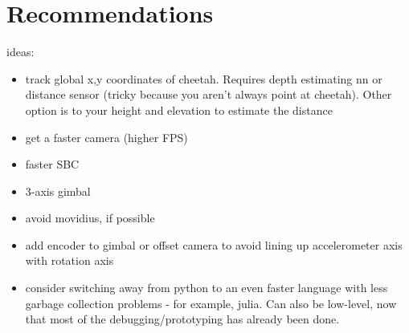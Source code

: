 \chapter{Recommendations}

ideas:
\begin{itemize}
	\item track global x,y coordinates of cheetah. Requires depth estimating nn or distance sensor (tricky because you aren't always point at cheetah). Other option is to your height and elevation to estimate the distance
	\item get a faster camera (higher FPS)
	\item faster SBC
	\item 3-axis gimbal
	\item avoid movidius, if possible
	\item add encoder to gimbal or offset camera to avoid lining up accelerometer axis with rotation axis
	\item consider switching away from python to an even faster language with less garbage collection problems - for example, julia. Can also be low-level, now that most of the debugging/prototyping has already been done.
\end{itemize}
